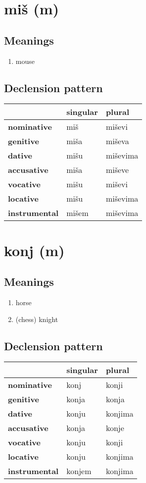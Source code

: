 \filbreak
\section{miš (m)}
\subsection*{Meanings}
\begin{enumerate}
\item mouse
\end{enumerate}
\subsection*{Declension pattern}
\begin{tabularx}{\linewidth}{Xll}
\toprule
{} & singular &    plural \\
\midrule
\textbf{nominative  } &      miš &    miševi \\
\textbf{genitive    } &     miša &    miševa \\
\textbf{dative      } &     mišu &  miševima \\
\textbf{accusative  } &     miša &    miševe \\
\textbf{vocative    } &     mišu &    miševi \\
\textbf{locative    } &     mišu &  miševima \\
\textbf{instrumental} &    mišem &  miševima \\
\bottomrule
\end{tabularx}

\filbreak
\section{konj (m)}
\subsection*{Meanings}
\begin{enumerate}
\item horse
\item (chess) knight
\end{enumerate}
\subsection*{Declension pattern}
\begin{tabularx}{\linewidth}{Xll}
\toprule
{} & singular &   plural \\
\midrule
\textbf{nominative  } &     konj &    konji \\
\textbf{genitive    } &    konja &    konja \\
\textbf{dative      } &    konju &  konjima \\
\textbf{accusative  } &    konja &    konje \\
\textbf{vocative    } &    konju &    konji \\
\textbf{locative    } &    konju &  konjima \\
\textbf{instrumental} &   konjem &  konjima \\
\bottomrule
\end{tabularx}

